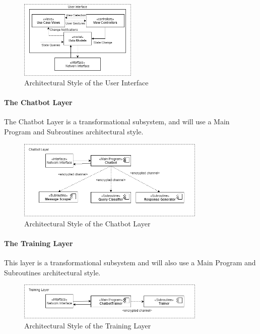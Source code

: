 \documentclass[11pt]{article}
\begin{document}
\begin{figure}[H]
	\centering
	\includegraphics[width=0.5\textwidth]{../../images/User_Interface_MVC.png}
	\caption{Architectural Style of the User Interface}
\end{figure}

\paragraph{The Chatbot Layer}
The Chatbot Layer is a transformational subsystem, and will use a Main Program and Subroutines architectural style.

\begin{figure}[H]
	\centering
	\includegraphics[width=0.8\textwidth]{../../images/Chatbot_Layer_Architecture.png}
	\caption{Architectural Style of the Chatbot Layer}
\end{figure}

\paragraph{The Training Layer}
This layer is a transformational subsystem and will also use a Main Program and Subroutines architectural style.

\begin{figure}[H]
	\centering
	\includegraphics[width=0.8\textwidth]{../../images/Training_Layer_Architecture.png}
	\caption{Architectural Style of the Training Layer}
\end{figure}
\end{document}
